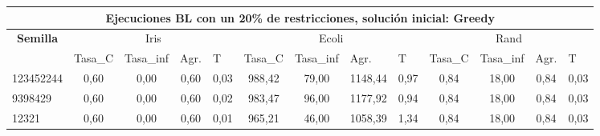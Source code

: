 \documentclass[12pt, spanish]{article}
\begin{document}
\begin{table}[H]
\small
\begin{adjustwidth}{-1cm}{-1cm}%

\begin{tabular}{|l|c|c|c|c|c|c|c|c|c|c|c|c|}
\hline
\multicolumn{13}{|c|}{\textbf{Ejecuciones BL con un 20\% de restricciones, solución inicial: Greedy}}                                                                                                                                                                                                                                                                                                                  \\ \hline
\multicolumn{1}{|c|}{\multirow{2}{*}{\textbf{Semilla}}} & \multicolumn{4}{c|}{Iris}                                                                                          & \multicolumn{4}{c|}{Ecoli}                                                                                         & \multicolumn{4}{c|}{Rand}                                                                                          \\ \cline{2-13} 
\multicolumn{1}{|c|}{}                                  & \multicolumn{1}{l|}{Tasa\_C} & \multicolumn{1}{l|}{Tasa\_inf} & \multicolumn{1}{l|}{Agr.} & \multicolumn{1}{l|}{T} & \multicolumn{1}{l|}{Tasa\_C} & \multicolumn{1}{l|}{Tasa\_inf} & \multicolumn{1}{l|}{Agr.} & \multicolumn{1}{l|}{T} & \multicolumn{1}{l|}{Tasa\_C} & \multicolumn{1}{l|}{Tasa\_inf} & \multicolumn{1}{l|}{Agr.} & \multicolumn{1}{l|}{T} \\ \hline
123452244                                               & 0,60                         & 0,00                           & 0,60                      & 0,03                   & 988,42                       & 79,00                          & 1148,44                   & 0,97                   & 0,84                         & 18,00                          & 0,84                      & 0,03                   \\ \hline
9398429                                                 & 0,60                         & 0,00                           & 0,60                      & 0,02                   & 983,47                       & 96,00                          & 1177,92                   & 0,94                   & 0,84                         & 18,00                          & 0,84                      & 0,03                   \\ \hline
12321                                                   & 0,60                         & 0,00                           & 0,60                      & 0,01                   & 965,21                       & 46,00                          & 1058,39                   & 1,34                   & 0,84                         & 18,00                          & 0,84                      & 0,03                   \\ \hline

\end{tabular}
\end{adjustwidth}
\end{table}
\end{document}
